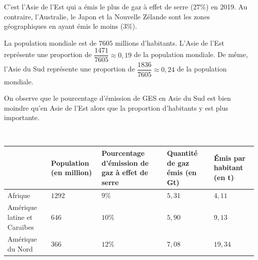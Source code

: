 \documentclass[12pt,a4paper]{book}
\begin{document}
\begin{enumMet}
	\item C'est l'Asie de l'Est qui a émis le plus de gaz à effet de serre (27\%) en 2019. Au contraire, l'Australie, le Japon et la Nouvelle Zélande sont les zones géographiques en ayant émis le moins (3\%).
	\item 
	\begin{enumMet}
		\item La population mondiale est de $7605$ millions d'habitants. L'Asie de l'Est représente une proportion de $\dfrac{1471}{7605} \approx 0,19$ de la population mondiale. De même, l'Asie du Sud représente une proportion de $\dfrac{1836}{7605} \approx 0,24$ de la population mondiale.
		\item On observe que le pourcentage d'émission de GES en Asie du Sud est bien moindre qu'en Asie de l'Est alors que la proportion d'habitants y est plus importante.
	\end{enumMet}
	\item \,
	
	\begin{tabular}{ | p{3cm} | p{} | p{} | p{} | p{} | }
		\hline
		
		
		& 
		
		Population (en million) & 
		
		Pourcentage d'émission de gaz à effet de serre & 
		
		Quantité de gaz émis (en Gt) & 
		
		Émis par habitant (en t)\\ \hline
		
		
		Afrique & 
		
		$1292$ & 
		
		$9\%$ & 
		
		$5,31$ & 
		
		$4,11$\\ \hline
		
		
		Amérique latine et Caraïbes & 
		
		$646$ & 
		
		$10\%$ & 
		
		$5,90$ & 
		
		$9,13$\\ \hline
		
		
		Amérique du Nord & 
		
		$366$ & 
		
		$12\%$ & 
		
		$7,08$ & 
		
		$19,34$\\ \hline
		

\end{tabular}
\end{enumMet}
\end{document}
